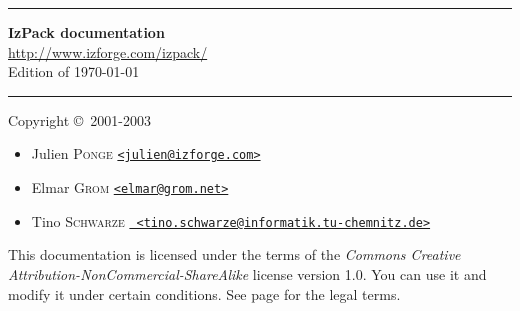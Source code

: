 \begin{titlepage}

\begin{center}
\hrule
\vspace{2em}
\Huge
\textbf{IzPack documentation}\\[2em]
\normalsize
\href{http://www.izforge.com/izpack/}{\url{http://www.izforge.com/izpack/}}\\[2em]
Edition of \today \\[2em]
\hrule
\end{center}

\vfill
\noindent Copyright \copyright\ 2001-2003
\begin{itemize}
\item Julien \textsc{Ponge} \href{mailto:julien@izforge.com}{\texttt{<julien@izforge.com>}}
\item Elmar \textsc{Grom} \href{mailto:elmar@grom.net}{\texttt{<elmar@grom.net>}} 
\item Tino \textsc{Schwarze} \href{mailto:tino.schwarze@informatik.tu-chemnitz.de}{\texttt{
                             <tino.schwarze@informatik.tu-chemnitz.de>}}
\end{itemize}

\vfill
\noindent
This documentation is licensed under the terms of the \textit{Commons Creative 
Attribution-NonCommercial-ShareAlike} license version 1.0. You can use it and
modify it under certain conditions. See page \pageref{CC-license} for the
legal terms.

\end{titlepage}
